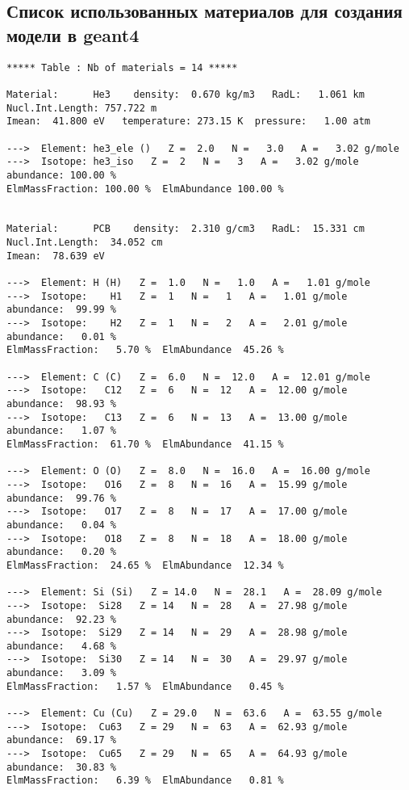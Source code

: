 \subsection{Список использованных материалов для создания модели в geant4}

\label{list:geamtmaterials}
\tiny{
\begin{verbatim}
***** Table : Nb of materials = 14 *****

Material:      He3    density:  0.670 kg/m3   RadL:   1.061 km   Nucl.Int.Length: 757.722 m  
Imean:  41.800 eV   temperature: 273.15 K  pressure:   1.00 atm

--->  Element: he3_ele ()   Z =  2.0   N =   3.0   A =   3.02 g/mole
--->  Isotope: he3_iso   Z =  2   N =   3   A =   3.02 g/mole   abundance: 100.00 %
ElmMassFraction: 100.00 %  ElmAbundance 100.00 % 


Material:      PCB    density:  2.310 g/cm3   RadL:  15.331 cm   Nucl.Int.Length:  34.052 cm 
Imean:  78.639 eV 

--->  Element: H (H)   Z =  1.0   N =   1.0   A =   1.01 g/mole
--->  Isotope:    H1   Z =  1   N =   1   A =   1.01 g/mole   abundance:  99.99 %
--->  Isotope:    H2   Z =  1   N =   2   A =   2.01 g/mole   abundance:   0.01 %
ElmMassFraction:   5.70 %  ElmAbundance  45.26 % 

--->  Element: C (C)   Z =  6.0   N =  12.0   A =  12.01 g/mole
--->  Isotope:   C12   Z =  6   N =  12   A =  12.00 g/mole   abundance:  98.93 %
--->  Isotope:   C13   Z =  6   N =  13   A =  13.00 g/mole   abundance:   1.07 %
ElmMassFraction:  61.70 %  ElmAbundance  41.15 % 

--->  Element: O (O)   Z =  8.0   N =  16.0   A =  16.00 g/mole
--->  Isotope:   O16   Z =  8   N =  16   A =  15.99 g/mole   abundance:  99.76 %
--->  Isotope:   O17   Z =  8   N =  17   A =  17.00 g/mole   abundance:   0.04 %
--->  Isotope:   O18   Z =  8   N =  18   A =  18.00 g/mole   abundance:   0.20 %
ElmMassFraction:  24.65 %  ElmAbundance  12.34 % 

--->  Element: Si (Si)   Z = 14.0   N =  28.1   A =  28.09 g/mole
--->  Isotope:  Si28   Z = 14   N =  28   A =  27.98 g/mole   abundance:  92.23 %
--->  Isotope:  Si29   Z = 14   N =  29   A =  28.98 g/mole   abundance:   4.68 %
--->  Isotope:  Si30   Z = 14   N =  30   A =  29.97 g/mole   abundance:   3.09 %
ElmMassFraction:   1.57 %  ElmAbundance   0.45 % 

--->  Element: Cu (Cu)   Z = 29.0   N =  63.6   A =  63.55 g/mole
--->  Isotope:  Cu63   Z = 29   N =  63   A =  62.93 g/mole   abundance:  69.17 %
--->  Isotope:  Cu65   Z = 29   N =  65   A =  64.93 g/mole   abundance:  30.83 %
ElmMassFraction:   6.39 %  ElmAbundance   0.81 % 



\end{verbatim}}
